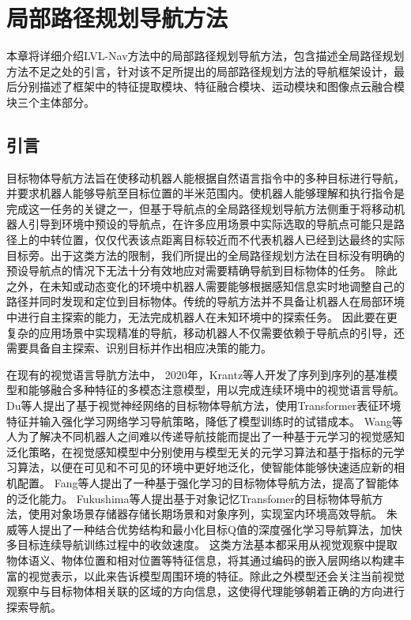 \chapter{局部路径规划导航方法}
本章将详细介绍LVL-Nav方法中的局部路径规划导航方法，包含描述全局路径规划方法不足之处的引言，针对该不足所提出的局部路径规划方法的导航框架设计，最后分别描述了框架中的特征提取模块、特征融合模块、运动模块和图像点云融合模块三个主体部分。


\section{引言}

目标物体导航方法旨在使移动机器人能根据自然语言指令中的多种目标进行导航，并要求机器人能够导航至目标位置的半米范围内。使机器人能够理解和执行指令是完成这一任务的关键之一，但基于导航点的全局路径规划导航方法侧重于将移动机器人引导到环境中预设的导航点，在许多应用场景中实际选取的导航点可能只是路径上的中转位置，仅仅代表该点距离目标较近而不代表机器人已经到达最终的实际目标旁。出于这类方法的限制，我们所提出的全局路径规划方法在目标没有明确的预设导航点的情况下无法十分有效地应对需要精确导航到目标物体的任务。
除此之外，在未知或动态变化的环境中机器人需要能够根据感知信息实时地调整自己的路径并同时发现和定位到目标物体。传统的导航方法并不具备让机器人在局部环境中进行自主探索的能力，无法完成机器人在未知环境中的探索任务。
因此要在更复杂的应用场景中实现精准的导航，移动机器人不仅需要依赖于导航点的引导，还需要具备自主探索、识别目标并作出相应决策的能力。

在现有的视觉语言导肮方法中，
2020年，Krantz\cite{krantz2020beyond}等人开发了序列到序列的基准模型和能够融合多种特征的多模态注意模型，用以完成连续环境中的视觉语言导航。
Du\cite{du2020learning, du2021vtnet}等人提出了基于视觉神经网络的目标物体导航方法，使用Transformer表征环境特征并输入强化学习网络学习导航策略，降低了模型训练时的试错成本。
Wang\cite{wang2021visual}等人为了解决不同机器人之间难以传递导航技能而提出了一种基于元学习的视觉感知泛化策略，在视觉感知模型中分别使用与模型无关的元学习算法和基于指标的元学习算法，以便在可见和不可见的环境中更好地泛化，使智能体能够快速适应新的相机配置。
Fang\cite{fang2022target}等人提出了一种基于强化学习的目标物体导航方法，提高了智能体的泛化能力。
Fukushima\cite{fukushima2022object}等人提出基于对象记忆Transfomer的目标物体导航方法，使用对象场景存储器存储长期场景和对象序列，实现室内环境高效导航。
朱威\cite{朱威2024结合优势结构和最小目标}等人提出了一种结合优势结构和最小化目标Q值的深度强化学习导航算法，加快多目标连续导航训练过程中的收敛速度。
这类方法基本都采用从视觉观察中提取物体语义、物体位置和相对位置等特征信息，将其通过编码的嵌入层网络以构建丰富的视觉表示，以此来告诉模型周围环境的特征。除此之外模型还会关注当前视觉观察中与目标物体相关联的区域的方向信息，这使得代理能够朝着正确的方向进行探索导航。

